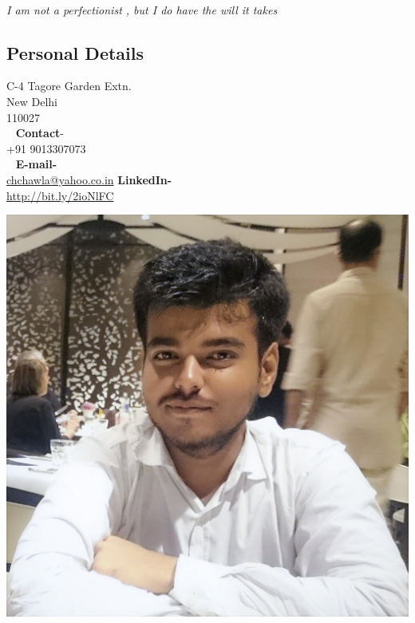 \documentclass[11pt]{article}
\begin{document}
\begin{mdframed}[backgroundcolor=black]
~
\begin{center}
\begin{Huge}
\end{Huge}
\end{center}
\begin{center}
\begin{large}
\color{white}\emph{I am not a perfectionist , but I do have the will it takes}
\end{large}
\end{center}
\end{mdframed}
\begin{minipage}{0.25\linewidth}

\begin{flushright}
	\section{\color{red}Per\color{black}sonal Details}
    C-4  
    Tagore Garden Extn.\\
    New Delhi\\
    110027\\
    ~
    \textbf{Contact}-\\
    +91 9013307073\\
    ~
    \textbf{E-mail-}\\
    \href{mailto:chchawla@yahoo.co.in}{chchawla@yahoo.co.in}
    \textbf{LinkedIn-}\\
    \href{http://bit.ly/2ioNlFC}{http://bit.ly/2ioNlFC}
\end{flushright}
\begin{center}
\includegraphics[scale=0.095]{picture}
\end{center}
\end{minipage}
\end{document}
